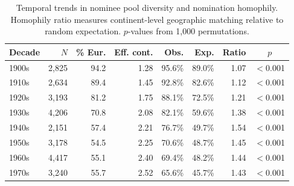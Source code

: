 \begin{table}[ht]
\centering
\caption{Temporal trends in nominee pool diversity and nomination homophily. Homophily ratio measures continent-level geographic matching relative to random expectation. $p$-values from 1{,}000 permutations.}
\label{tab:temporal_homophily}
\small
\begin{tabular}{lrrrrrrc}
\toprule
Decade & $N$ & \% Eur. & Eff. cont. & Obs. & Exp. & Ratio & $p$ \\
\midrule
1900s & 2,825 & 94.2 & 1.28 & 95.6\% & 89.0\% & 1.07 & $<$0.001 \\
1910s & 2,634 & 89.4 & 1.45 & 92.8\% & 82.6\% & 1.12 & $<$0.001 \\
1920s & 3,193 & 81.2 & 1.75 & 88.1\% & 72.5\% & 1.21 & $<$0.001 \\
1930s & 4,206 & 70.8 & 2.08 & 82.1\% & 59.6\% & 1.38 & $<$0.001 \\
1940s & 2,151 & 57.4 & 2.21 & 76.7\% & 49.7\% & 1.54 & $<$0.001 \\
1950s & 3,178 & 54.5 & 2.25 & 70.6\% & 48.7\% & 1.45 & $<$0.001 \\
1960s & 4,417 & 55.1 & 2.40 & 69.4\% & 48.2\% & 1.44 & $<$0.001 \\
1970s & 3,240 & 55.7 & 2.52 & 65.6\% & 45.7\% & 1.43 & $<$0.001 \\
\bottomrule
\end{tabular}
\end{table}
